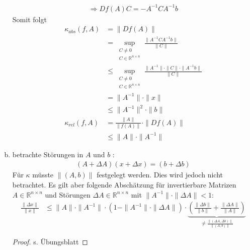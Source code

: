 \documentclass[ngerman,fontsize=11pt, paper=a4, parskip=half, titlepage=true, toc=bib]{scrbook}
\newcommand{\R}{\mathds{R}}
\newcommand{\Renn}{\mathds{R}^{n\times n}}
\begin{document}
\begin{enumerate}[a)]
			\begin{gather*}
				\Rightarrow Df(A) C = -A^{-1}CA^{-1}b
			\end{gather*}
			Somit folgt
			\begin{align}
				\nonumber
				\kappa_{abs} (f,A) &= \|Df(A)\| \\ \nonumber
											  &= \sup_{\substack{
																C\neq 0 \\ 
																C\in \R^{n\times n}											  	
														  	}}
														  \frac{\|A^{-1}CA^{-1}b\|}{\|C\|} \\ \nonumber
											  &\leq \sup_{\substack{
															 	C\neq 0 \\ 
															 	C \in \R^{n\times n}														  	
															 }}
												 \frac{\|A^{-1}\|\cdot\|C\|\cdot\|A^{-1}b\|}{\|C\|} \\ \nonumber
											  &= \|A^{-1}\| \cdot\|x\| \\ \nonumber
											  &\leq   \|A^{-1}\|^2 \cdot\|b\| \\ \nonumber
				 \kappa_{rel}(f,A)  &= \frac{\|A\|}{\|f(A)\|} \cdot \|Df(A)\| \\
											 &\leq \|A\|\cdot \|A^{-1}\| \label{III.2.10}
			\end{align}
	 \item betrachte Störungen in $A$ und $b$ :
		 \begin{gather*}
		 	(A+\Delta A)(x+\Delta x) = (b+\Delta b) 
		 \end{gather*}
		 Für $\kappa$ müsste $\|(A,b)\|$ festgelegt werden. Dies wird jedoch nicht betrachtet. Es gilt aber folgende Abschätzung für invertierbare Matrizen $A\in \Renn $ und Störungen
		 $\Delta A \in \R^{n\times n}$ mit $\|A^{-1}\|\cdot \|\Delta A\| < 1$:
		 \begin{align}
			 \frac{\|\Delta x\|}{\|x\|} & \leq \|A\| \cdot \|A^{-1}\|\cdot (1- \|A^{-1}\|\cdot \|\Delta A\|) 
													 \cdot
													 \underbrace{\left(  \frac{\|\Delta b\|}{\|b\|} +  \frac{\|\Delta A\|}{\|A\|}  \right)}_{\neq  \frac{\|(\Delta A, \Delta b)\|}{\|(A,b)\|} }
													 \label{III.2.11}
		 \end{align}
		 \begin{proof} s. Übungsblatt \end{proof}
\end{enumerate}
\end{document}
